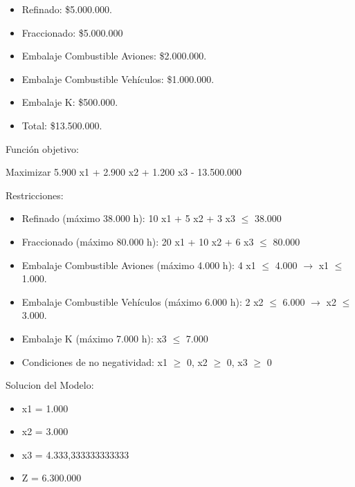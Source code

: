 \documentclass[10pt,a4paper]{article}
\begin{document}
\begin{enumerate}
    \begin{itemize}

        \item Refinado: \$5.000.000.
        \item Fraccionado: \$5.000.000
        \item Embalaje Combustible Aviones: \$2.000.000.
        \item Embalaje Combustible Vehículos: \$1.000.000.
        \item Embalaje K: \$500.000.
        \item Total: \$13.500.000. \\

    \end{itemize}


    Función objetivo: 

    \begin{center}
        
        Maximizar 5.900 x1 + 2.900 x2 + 1.200 x3 - 13.500.000

    \end{center}


    Restricciones: 

    \begin{itemize}

        \item Refinado (máximo 38.000 h): 10 x1 + 5 x2 + 3 x3 $\leq$ 38.000
        \item Fraccionado (máximo 80.000 h): 20 x1 + 10 x2 + 6 x3 $\leq$ 80.000
        \item Embalaje Combustible Aviones (máximo 4.000 h): 4 x1 $\leq$ 4.000 $\rightarrow$ x1 $\leq$ 1.000.
        \item Embalaje Combustible Vehículos (máximo 6.000 h): 2 x2 $\leq$ 6.000 $\rightarrow$ x2 $\leq$ 3.000.
        \item Embalaje K (máximo 7.000 h): x3 $\leq$ 7.000
        \item Condiciones de no negatividad: x1 $\geq$ 0, x2 $\geq$ 0, x3 $\geq$ 0\\

    \end{itemize}

    \clearpage

    Solucion del Modelo: 

    \begin{itemize}

        \item x1 = 1.000
        \item x2 = 3.000
        \item x3 = 4.333,333333333333
        \item Z = 6.300.000\\


\end{itemize}
\end{enumerate}
\end{document}
